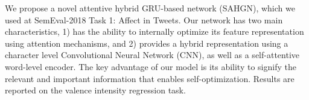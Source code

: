 We propose a novel attentive hybrid GRU-based network (SAHGN), which we used at SemEval-2018 Task 1: Affect in Tweets. Our network has two main characteristics, 1) has the ability to internally optimize its feature representation using attention mechanisms, and 2) provides a hybrid representation using a character level Convolutional Neural Network (CNN), as well as a self-attentive word-level encoder. The key advantage of our model is its ability to signify the relevant and important information that enables self-optimization. Results are reported on the valence intensity regression task.
